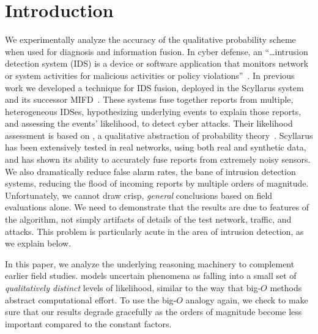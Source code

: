 \section{Introduction}
\label{sec:introduction}

We experimentally analyze the accuracy of the \zplus qualitative
probability scheme when used for diagnosis and information fusion.
In cyber defense, an ``\ldots intrusion detection system (IDS) is a device or
software application that monitors network or system activities for malicious
activities or policy violations''~\cite{wiki:ids}.
In previous work we developed a technique for IDS
fusion, deployed in the Scyllarus system~ and its
successor MIFD~.
These systems fuse together reports from multiple, heterogeneous IDSes,
hypothesizing underlying events to explain those reports, and assessing the events'
likelihood, to detect cyber attacks.
Their likelihood assessment is based on \zplus, a qualitative
abstraction of probability theory~\cite{Goldszmidt:96}.
Scyllarus has been extensively tested in real networks, using both
real and synthetic data, and has shown its ability to accurately fuse reports
from extremely noisy sensors. 
We also
dramatically reduce false alarm rates, the bane of intrusion
detection systems, reducing the flood of incoming reports by multiple
orders of magnitude.
Unfortunately, we cannot draw crisp, \emph{general} conclusions based on
field evaluations alone.
We need to demonstrate that the results are due to features of the algorithm,
not simply artifacts of details of the test network, traffic, and
attacks.  This problem is particularly acute in the area of intrusion detection,
as we explain below.
%

In this paper, we analyze the underlying reasoning machinery to
complement earlier field studies.
%
\zplus models uncertain phenomena as falling into a small set of
\emph{qualitatively distinct} levels of likelihood, similar to the way that
big-$O$ methods abstract computational effort.
To use the big-$O$ analogy again, we check to make sure that our results degrade
gracefully as the orders of magnitude become less important compared to the
constant factors.

